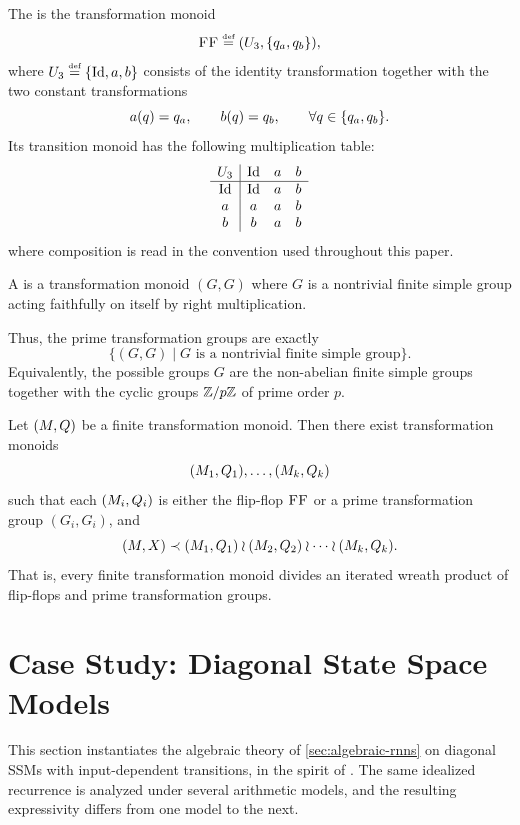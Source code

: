 \documentclass{article}
\begin{document}
\begin{definition}
    The  is the transformation monoid
    $$
        \textsc{FF} \mathrel{\stackrel{\textnormal{\tiny def}}{=}} (U_3, \{q_a,q_b\}),
    $$
    where $U_3 \mathrel{\stackrel{\textnormal{\tiny def}}{=}} \{\mathrm{Id},a,b\}$ consists of the identity transformation together with the two constant transformations
    $$
        a(q)=q_a,
        \qquad
        b(q)=q_b, 
        \qquad \forall q\in\{q_a,q_b\}.
    $$
    Its transition monoid has the following multiplication table:
    $$
    \begin{array}{c|ccc}
       U_3  & \mathrm{Id} & a & b \\
       \hline
        \mathrm{Id} & \mathrm{Id} & a & b \\
        a & a & a & b \\
        b & b & a & b
    \end{array}
    $$
    where composition is read in the convention used throughout this paper.
\end{definition}

\begin{definition}
    A  is a transformation monoid $(G, G)$
    where $G$ is a nontrivial finite simple group acting faithfully on itself by right multiplication.
\end{definition}

Thus, the prime transformation groups are exactly
$$
    \{(G,G)\mid G \text{ is a nontrivial finite simple group}\}.
$$
Equivalently, the possible groups $G$ are the non-abelian finite simple groups together with the cyclic groups $\mathbb{Z}/{p}\mathbb{Z}$ of prime order $p$.

\begin{theorem}\label{thm:kr}
    Let $(M, Q)$ be a finite transformation monoid. Then there exist transformation monoids
    $$
        (M_1, Q_1),\ldots,(M_k, Q_k)
    $$
    such that each $(M_i,Q_i)$ is either the flip-flop $\textsc{FF}$ or a prime transformation group $(G_i,G_i)$, and
    $$
        (M,X) \prec (M_1,Q_1) \wr (M_2,Q_2) \wr \cdots \wr (M_k,Q_k).
    $$
    That is, every finite transformation monoid divides an iterated wreath product of flip-flops and prime transformation groups.
\end{theorem}


\section{Case Study: Diagonal State Space Models}\label{sec:case-study}
This section instantiates the algebraic theory of \cref{sec:algebraic-rnns} on diagonal SSMs with input-dependent transitions, in the spirit of \citet{sarrof2024expressive}.
The same idealized recurrence is analyzed under several arithmetic models, and the resulting expressivity differs from one model to the next.
\end{document}
